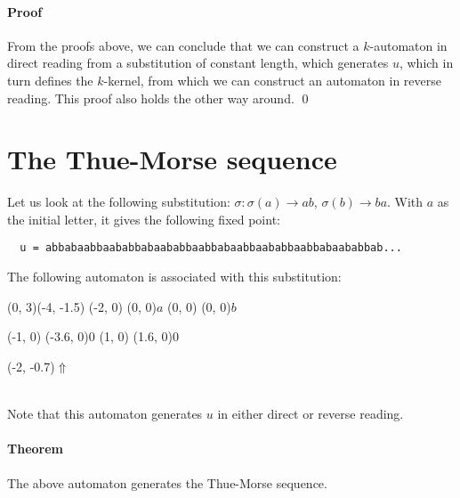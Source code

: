 \documentclass{article}
\begin{document}
\paragraph{Proof}
From the proofs above, we can conclude that we can construct a $k$-automaton in
direct reading from a substitution of constant length, which generates $u$,
which in turn defines the $k$-kernel, from which we can construct an automaton
in reverse reading. This proof also holds the other way around. \qed

\section*{The Thue-Morse sequence}
Let us look at the following substitution: $\sigma: \sigma(a) \rightarrow ab$,
$\sigma(b) \rightarrow ba$. With $a$ as the initial letter, it gives the
following fixed point:
\begin{verbatim}
  u = abbabaabbaababbabaababbaabbabaabbaababbaabbabaababbab...
\end{verbatim}
The following automaton is associated with this
substitution:\\
\begin{graph}(0, 3)(-4, -1.5)
  (-2, 0) (0, 0){$a$}
  (0, 0)  (0, 0){$b$}

  (-1, 0) \freetext(-3.6, 0){0}
   
   
  (1, 0) \freetext(1.6, 0){0}

  \freetext(-2, -0.7){$\Uparrow$}
\end{graph}\\
Note that this automaton generates $u$ in either direct or reverse reading.

\paragraph{Theorem} The above automaton generates the Thue-Morse sequence.
\end{document}
